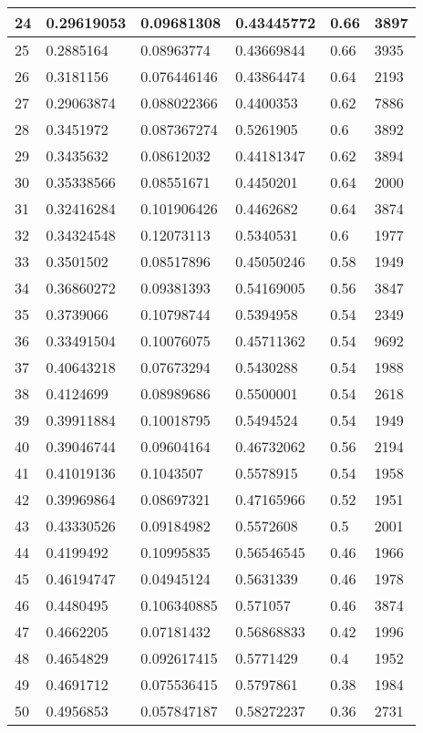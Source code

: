 \begin{longtable}{|l|l|l|l|l|l|}
24 & 0.29619053 & 0.09681308 & 0.43445772 & 0.66 & 3897 \\ \hline 
25 & 0.2885164 & 0.08963774 & 0.43669844 & 0.66 & 3935 \\ \hline 
26 & 0.3181156 & 0.076446146 & 0.43864474 & 0.64 & 2193 \\ \hline 
27 & 0.29063874 & 0.088022366 & 0.4400353 & 0.62 & 7886 \\ \hline 
28 & 0.3451972 & 0.087367274 & 0.5261905 & 0.6 & 3892 \\ \hline 
29 & 0.3435632 & 0.08612032 & 0.44181347 & 0.62 & 3894 \\ \hline 
30 & 0.35338566 & 0.08551671 & 0.4450201 & 0.64 & 2000 \\ \hline 
31 & 0.32416284 & 0.101906426 & 0.4462682 & 0.64 & 3874 \\ \hline 
32 & 0.34324548 & 0.12073113 & 0.5340531 & 0.6 & 1977 \\ \hline 
33 & 0.3501502 & 0.08517896 & 0.45050246 & 0.58 & 1949 \\ \hline 
34 & 0.36860272 & 0.09381393 & 0.54169005 & 0.56 & 3847 \\ \hline 
35 & 0.3739066 & 0.10798744 & 0.5394958 & 0.54 & 2349 \\ \hline 
36 & 0.33491504 & 0.10076075 & 0.45711362 & 0.54 & 9692 \\ \hline 
37 & 0.40643218 & 0.07673294 & 0.5430288 & 0.54 & 1988 \\ \hline 
38 & 0.4124699 & 0.08989686 & 0.5500001 & 0.54 & 2618 \\ \hline 
39 & 0.39911884 & 0.10018795 & 0.5494524 & 0.54 & 1949 \\ \hline 
40 & 0.39046744 & 0.09604164 & 0.46732062 & 0.56 & 2194 \\ \hline 
41 & 0.41019136 & 0.1043507 & 0.5578915 & 0.54 & 1958 \\ \hline 
42 & 0.39969864 & 0.08697321 & 0.47165966 & 0.52 & 1951 \\ \hline 
43 & 0.43330526 & 0.09184982 & 0.5572608 & 0.5 & 2001 \\ \hline 
44 & 0.4199492 & 0.10995835 & 0.56546545 & 0.46 & 1966 \\ \hline 
45 & 0.46194747 & 0.04945124 & 0.5631339 & 0.46 & 1978 \\ \hline 
46 & 0.4480495 & 0.106340885 & 0.571057 & 0.46 & 3874 \\ \hline 
47 & 0.4662205 & 0.07181432 & 0.56868833 & 0.42 & 1996 \\ \hline 
48 & 0.4654829 & 0.092617415 & 0.5771429 & 0.4 & 1952 \\ \hline 
49 & 0.4691712 & 0.075536415 & 0.5797861 & 0.38 & 1984 \\ \hline 
50 & 0.4956853 & 0.057847187 & 0.58272237 & 0.36 & 2731 \\ \hline 
\end{longtable}